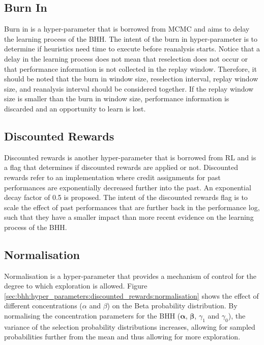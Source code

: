 \subsection{Burn In}\label{sec:bhh:hyper_parameters:burn_in}

Burn in is a hyper-parameter that is borrowed from \acf{MCMC} and aims to delay the learning process of the \acs{BHH}. The intent of the burn in hyper-parameter is to determine if heuristics need time to execute before reanalysis starts. Notice that a delay in the learning process does not mean that reselection does not occur or that performance information is not collected in the replay window. Therefore, it should be noted that the burn in window size, reselection interval, replay window size, and reanalysis interval should be considered together. If the replay window size is smaller than the burn in window size, performance information is discarded and an opportunity to learn is lost.

\subsection{Discounted Rewards}\label{sec:bhh:hyper_parameters:discounted_rewards}

Discounted rewards is another hyper-parameter that is borrowed from \acs{RL} and is a flag that determines if discounted rewards are applied or not. Discounted rewards refer to an implementation where credit assignments for past performances are exponentially decreased further into the past. An exponential decay factor of 0.5 is proposed. The intent of the discounted rewards flag is to scale the effect of past performances that are further back in the performance log, such that they have a smaller impact than more recent evidence on the learning process of the \acs{BHH}.

\subsection{Normalisation}\label{sec:bhh:hyper_parameters:normalisation}

Normalisation is a hyper-parameter that provides a mechanism of control for the degree to which exploration is allowed. Figure \ref{sec:bhh:hyper_parameters:discounted_rewards:normalisation} shows the effect of different concentrations ($\alpha$ and $\beta$) on the Beta probability distribution. By normalising the concentration parameters for the \acs{BHH} ($\boldsymbol{\alpha}$, $\boldsymbol{\beta}$, $\gamma_{1}$ and $\gamma_{0}$), the variance of the selection probability distributions increases, allowing for sampled probabilities further from the mean and thus allowing for more exploration.

